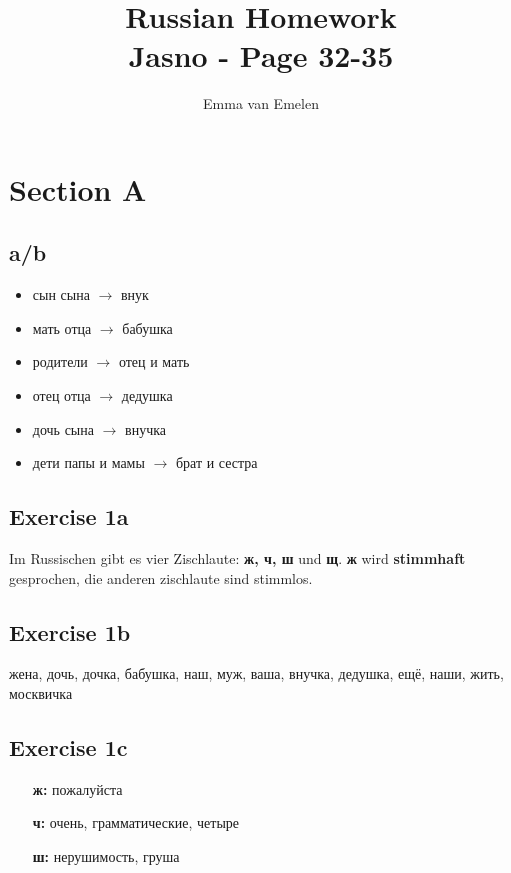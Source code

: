 \documentclass[a4paper, 11pt]{article}
\author{Emma van Emelen}
\title{Russian Homework\\\Large Jasno - Page 32-35}
\begin{document}
     \maketitle
     \newpage
     \tableofcontents
     \newpage

     \section{Section A}
     \subsection{a/b}
     \begin{itemize}
       \item сын сына $\rightarrow$ внук
       \item мать отца $\rightarrow$ бабушка
       \item родители $\rightarrow$ отец и мать
       \item отец отца $\rightarrow$ дедушка
       \item дочь сына $\rightarrow$ внучка
       \item дети папы и мамы $\rightarrow$ брат и сестра
     \end{itemize}
     \subsection{Exercise 1a}
     Im Russischen gibt es vier Zischlaute: \textbf{ж, ч, ш} und \textbf{щ}.
     \textbf{ж} wird \textbf{stimmhaft} gesprochen, die anderen zischlaute sind stimmlos.
     \subsection{Exercise 1b}
     жена, дочь, дочка, бабушка, наш, муж, ваша, внучка, дедушка, ещё, наши, жить, москвичка
     \subsection{Exercise 1c}
     \begin{itemize}
      \item[\textbf{ж:}] пожалуйста
      \item[\textbf{ч:}] очень, грамматические, четыре
      \item[\textbf{ш:}] нерушимость, груша
     \end{itemize}
\end{document}
